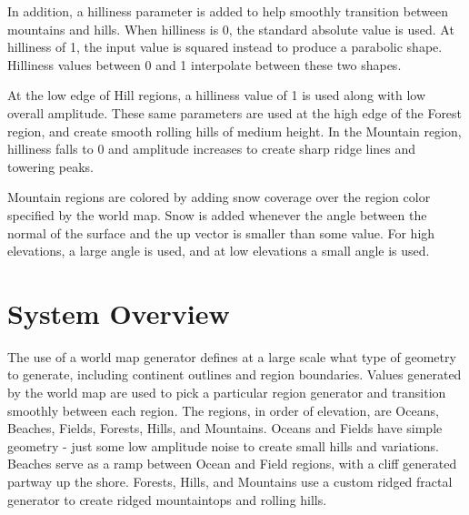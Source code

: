 In addition, a hilliness parameter is added to help smoothly transition between mountains and hills.
When hilliness is 0, the standard absolute value is used.
At hilliness of 1, the input value is squared instead to produce a parabolic shape.
Hilliness values between 0 and 1 interpolate between these two shapes.

At the low edge of Hill regions, a hilliness value of 1 is used along with low overall amplitude.
These same parameters are used at the high edge of the Forest region, and create smooth rolling hills of medium height.
In the Mountain region, hilliness falls to 0 and amplitude increases to create sharp ridge lines and towering peaks.

Mountain regions are colored by adding snow coverage over the region color specified by the world map.
Snow is added whenever the angle between the normal of the surface and the up vector is smaller than some value.
For high elevations, a large angle is used, and at low elevations a small angle is used.

\section{System Overview}

The use of a world map generator defines at a large scale what type of geometry to generate, including continent outlines and region boundaries.
Values generated by the world map are used to pick a particular region generator and transition smoothly between each region.
The regions, in order of elevation, are Oceans, Beaches, Fields, Forests, Hills, and Mountains.
Oceans and Fields have simple geometry - just some low amplitude noise to create small hills and variations.
Beaches serve as a ramp between Ocean and Field regions, with a cliff generated partway up the shore.
Forests, Hills, and Mountains use a custom ridged fractal generator to create ridged mountaintops and rolling hills.

